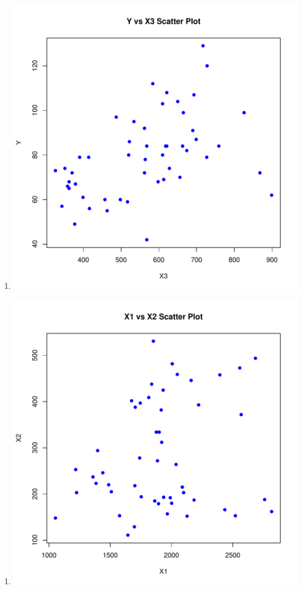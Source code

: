 \documentclass[12pt,letterpaper]{article}
\begin{document}
\begin{itemize}
		  
		\begin{enumerate}
			\item[]
			\includegraphics[width=.85\textwidth]{plot.Y.X3_YuFan.pdf}
		\end{enumerate} 
		
		  
		\begin{enumerate}
			\item[]
			\includegraphics[width=.85\textwidth]{plot.X1.X2_YuFan.pdf}
		\end{enumerate} 
		

\end{itemize}
\end{document}
